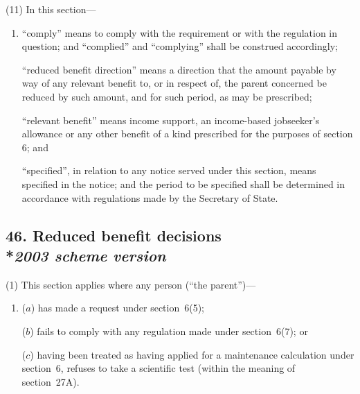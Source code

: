 \documentclass[12pt,a4paper]{article}
\begin{document}
(11) In this section—
\begin{enumerate}\item[]
    “comply” means to comply with the requirement or with the regulation in question; and “complied” and “complying” shall be construed accordingly;

    “reduced benefit direction” means a direction%
that the amount payable by way of any relevant benefit to, or in respect of, the parent concerned be reduced by such amount, and for such period, as may be prescribed;

    “relevant benefit” means income support, 
an income-based jobseeker’s allowance  %
or any other benefit of a kind prescribed for the purposes of section 6; and

    “specified”, in relation to any notice served under this section, means specified in the notice; and the period to be specified shall be determined in accordance with regulations made by the Secretary of State. 
\end{enumerate}


\subsection[46. Reduced benefit decisions --- \emph{2003 scheme version}]{46. Reduced benefit decisions\\*\emph{2003 scheme version}}

(1) This section applies where any person (“the parent”)—
\begin{enumerate}\item[]
($a$) has made a request under section~6(5);

($b$) fails to comply with any regulation made under section~6(7); or

($c$) having been treated as having applied for a maintenance calculation under section~6, refuses to take a scientific test (within the meaning of section~27A).
\end{enumerate}
\end{document}
